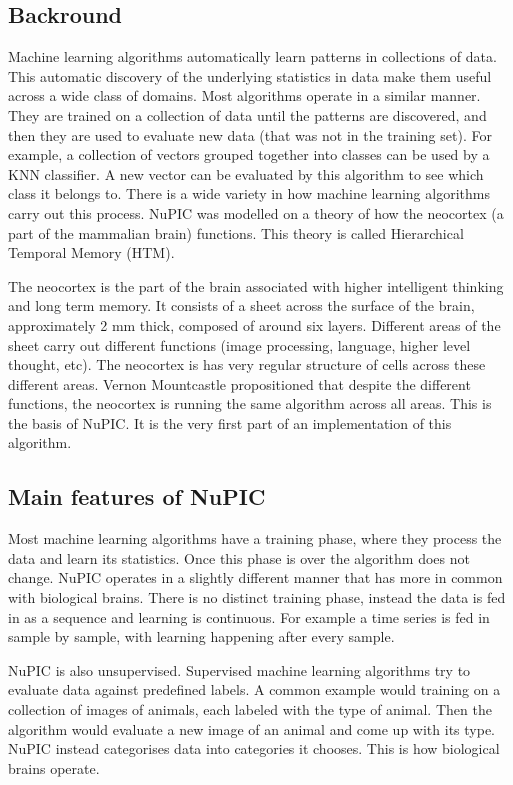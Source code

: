 \documentclass[a4paper]{jpconf}
\begin{document}
	\subsection{Backround}
		Machine learning algorithms automatically learn patterns in collections of data. This automatic discovery of the underlying statistics in data make them useful across a wide class of domains. Most algorithms operate in a similar manner. They are trained on a collection of data until the patterns are discovered, and then they are used to evaluate new data (that was not in the training set). For example, a collection of vectors grouped together into classes can be used by a KNN classifier. A new vector can be evaluated by this algorithm to see which class it belongs to. There is a wide variety in how machine learning algorithms carry out this process. NuPIC was modelled on a theory of how the neocortex (a part of the mammalian brain) functions. This theory is called Hierarchical Temporal Memory (HTM).
		
		The neocortex is the part of the brain associated with higher intelligent thinking and long term memory. It consists of a sheet across the surface of the brain, approximately 2 mm thick, composed of around six layers. Different areas of the sheet carry out different functions (image processing, language, higher level thought, etc). The neocortex is has very regular structure of cells across these different areas. Vernon Mountcastle propositioned that despite the different functions, the neocortex is running the same algorithm across all areas. This is the basis of NuPIC. It is the very first part of an implementation of this algorithm.
	
	\subsection{Main features of NuPIC}
		Most machine learning algorithms have a training phase, where they process the data and learn its statistics. Once this phase is over the algorithm does not change. NuPIC operates in a slightly different manner that has more in common with biological brains. There is no distinct training phase, instead the data is fed in as a sequence and learning is continuous. For example a time series is fed in sample by sample, with learning happening after every sample.
		
		NuPIC is also unsupervised. Supervised machine learning algorithms try to evaluate data against predefined labels. A common example would training on a collection of images of animals, each labeled with the type of animal. Then the algorithm would evaluate a new image of an animal and come up with its type. NuPIC instead categorises data into categories it chooses. This is how biological brains operate.
		
\end{document}
